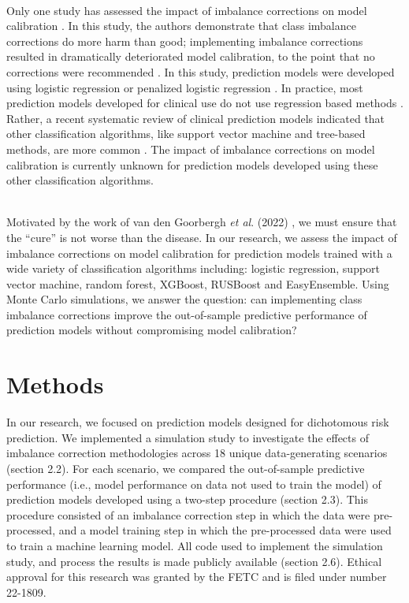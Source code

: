 \documentclass[AMA,STIX1COL,]{WileyNJD-v2}
\begin{document}
\strut \\
Only one study has assessed the impact of imbalance corrections on model
calibration \citep{ruben}. In this study, the authors demonstrate that
class imbalance corrections do more harm than good; implementing
imbalance corrections resulted in dramatically deteriorated model
calibration, to the point that no corrections were recommended
\citep{ruben}. In this study, prediction models were developed using
logistic regression or penalized logistic regression \citep{ruben}. In
practice, most prediction models developed for clinical use do not use
regression based methods \citep{constanza}. Rather, a recent systematic
review of clinical prediction models indicated that other classification
algorithms, like support vector machine and tree-based methods, are more
common \citep{constanza}. The impact of imbalance corrections on model
calibration is currently unknown for prediction models developed using
these other classification algorithms.\\
\strut \\
Motivated by the work of van den Goorbergh \emph{et al}. (2022)
\citep{ruben}, we must ensure that the ``cure'' is not worse than the
disease. In our research, we assess the impact of imbalance corrections
on model calibration for prediction models trained with a wide variety
of classification algorithms including: logistic regression, support
vector machine, random forest, XGBoost, RUSBoost and EasyEnsemble. Using
Monte Carlo simulations, we answer the question: can implementing class
imbalance corrections improve the out-of-sample predictive performance
of prediction models without compromising model calibration?

\hypertarget{methods}{%
\section{Methods}\label{methods}}

In our research, we focused on prediction models designed for
dichotomous risk prediction. We implemented a simulation study to
investigate the effects of imbalance correction methodologies across 18
unique data-generating scenarios (section 2.2). For each scenario, we
compared the out-of-sample predictive performance (i.e., model
performance on data not used to train the model) of prediction models
developed using a two-step procedure (section 2.3). This procedure
consisted of an imbalance correction step in which the data were
pre-processed, and a model training step in which the pre-processed data
were used to train a machine learning model. All code used to implement
the simulation study, and process the results is made publicly available
(section 2.6). Ethical approval for this research was granted by the
FETC and is filed under number 22-1809.
\end{document}
